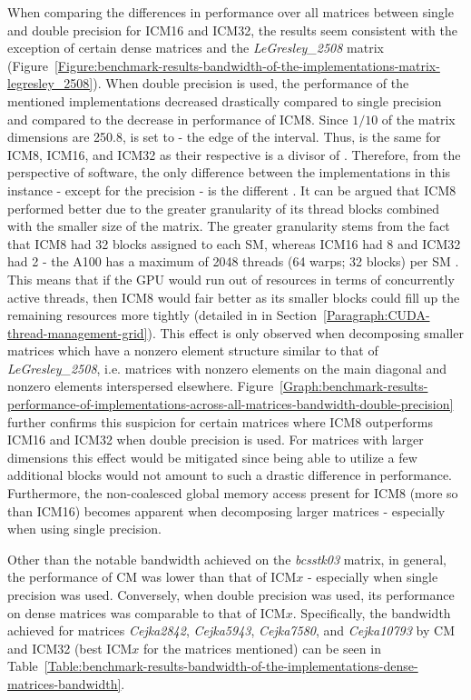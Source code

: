 When comparing the differences in performance over all matrices between single and double precision for ICM16 and ICM32, the results seem consistent with the exception of certain dense matrices and the \textit{LeGresley\_2508} matrix (Figure~\ref{Figure:benchmark-results-bandwidth-of-the-implementations-matrix-legresley_2508}). When double precision is used, the performance of the mentioned implementations decreased drastically compared to single precision and compared to the decrease in performance of ICM8. Since $ 1/10 $ of the matrix dimensions are 250.8,  is set to  - the edge of the interval. Thus,  is the same for ICM8, ICM16, and ICM32 as their respective  is a divisor of . Therefore, from the perspective of software, the only difference between the implementations in this instance - except for the precision - is the different . It can be argued that ICM8 performed better due to the greater granularity of its thread blocks combined with the smaller size of the matrix. The greater granularity stems from the fact that ICM8 had 32 blocks assigned to each SM, whereas ICM16 had 8 and ICM32 had  2 - the A100 has a maximum of 2048 threads (64 warps; 32 blocks) per SM \cite{soj8qSRbfefUdi8Y}. This means that if the GPU would run out of resources in terms of concurrently active threads, then ICM8 would fair better as its smaller blocks could fill up the remaining resources more tightly (detailed in \textit{} in Section~\ref{Paragraph:CUDA-thread-management-grid}). This effect is only observed when decomposing smaller matrices which have a nonzero element structure similar to that of \textit{LeGresley\_2508}, i.e. matrices with nonzero elements on the main diagonal and nonzero elements interspersed elsewhere. Figure~\ref{Graph:benchmark-results-performance-of-implementations-across-all-matrices-bandwidth-double-precision} further confirms this suspicion for certain matrices where ICM8 outperforms ICM16 and ICM32 when double precision is used. For matrices with larger dimensions this effect would be mitigated since being able to utilize a few additional blocks would not amount to such a drastic difference in performance. Furthermore, the non-coalesced global memory access present for ICM8 (more so than ICM16) becomes apparent when decomposing larger matrices - especially when using single precision.
\par Other than the notable bandwidth achieved on the \textit{bcsstk03} matrix, in general, the performance of CM was lower than that of ICM$ x $ - especially when single precision was used. Conversely, when double precision was used, its performance on dense matrices was comparable to that of ICM$ x $. Specifically, the bandwidth achieved for matrices \textit{Cejka2842}, \textit{Cejka5943}, \textit{Cejka7580}, and \textit{Cejka10793} by CM and ICM32 (best ICM$ x $ for the matrices mentioned) can be seen in Table~\ref{Table:benchmark-results-bandwidth-of-the-implementations-dense-matrices-bandwidth}.

